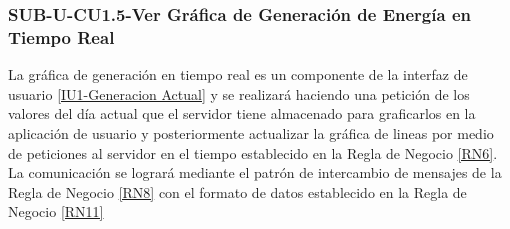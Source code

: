 \subsubsection{SUB-U-CU1.5-Ver Gráfica de Generación de Energía en Tiempo Real}\label{SUB-U-CU1.5}
La gráfica de generación en tiempo real es un componente de la interfaz de usuario \hyperref[fig:monitoreo]{[IU1-Generacion Actual]} y se realizará haciendo una petición de los valores del día actual que el servidor tiene almacenado para graficarlos en la aplicación de usuario y posteriormente actualizar la gráfica de lineas por medio de peticiones al servidor en el tiempo establecido en la Regla de Negocio \ref{RN6}.
\\ La comunicación se logrará mediante el patrón de intercambio de mensajes de la Regla de Negocio \ref{RN8} con el formato de datos establecido en la Regla de Negocio \ref{RN11}  

